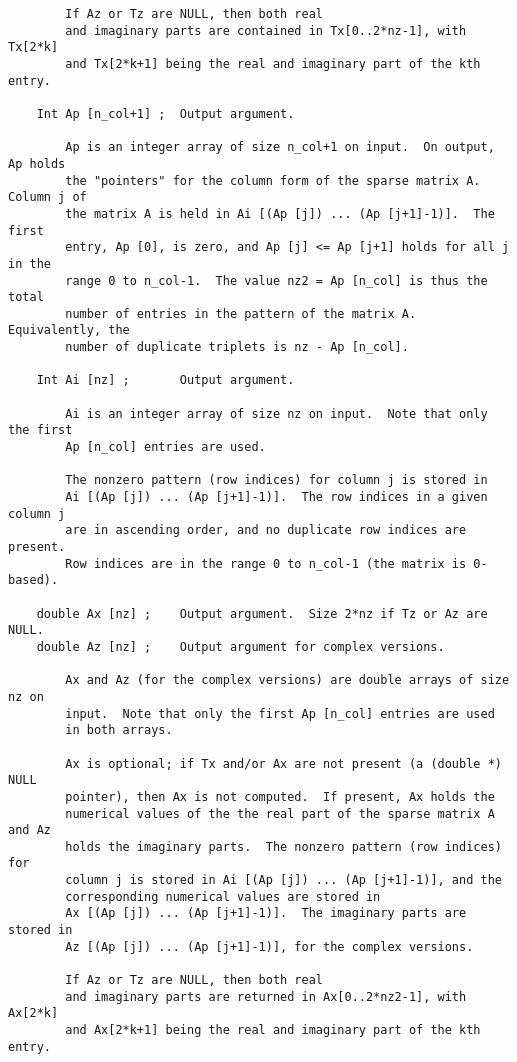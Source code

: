 \documentclass[11pt]{article}
\begin{document}
{\begin{verbatim}
        If Az or Tz are NULL, then both real
        and imaginary parts are contained in Tx[0..2*nz-1], with Tx[2*k]
        and Tx[2*k+1] being the real and imaginary part of the kth entry.

    Int Ap [n_col+1] ;  Output argument.

        Ap is an integer array of size n_col+1 on input.  On output, Ap holds
        the "pointers" for the column form of the sparse matrix A.  Column j of
        the matrix A is held in Ai [(Ap [j]) ... (Ap [j+1]-1)].  The first
        entry, Ap [0], is zero, and Ap [j] <= Ap [j+1] holds for all j in the
        range 0 to n_col-1.  The value nz2 = Ap [n_col] is thus the total
        number of entries in the pattern of the matrix A.  Equivalently, the
        number of duplicate triplets is nz - Ap [n_col].

    Int Ai [nz] ;       Output argument.

        Ai is an integer array of size nz on input.  Note that only the first
        Ap [n_col] entries are used.

        The nonzero pattern (row indices) for column j is stored in
        Ai [(Ap [j]) ... (Ap [j+1]-1)].  The row indices in a given column j
        are in ascending order, and no duplicate row indices are present.
        Row indices are in the range 0 to n_col-1 (the matrix is 0-based).

    double Ax [nz] ;    Output argument.  Size 2*nz if Tz or Az are NULL.
    double Az [nz] ;    Output argument for complex versions.

        Ax and Az (for the complex versions) are double arrays of size nz on
        input.  Note that only the first Ap [n_col] entries are used
        in both arrays.

        Ax is optional; if Tx and/or Ax are not present (a (double *) NULL
        pointer), then Ax is not computed.  If present, Ax holds the
        numerical values of the the real part of the sparse matrix A and Az
        holds the imaginary parts.  The nonzero pattern (row indices) for
        column j is stored in Ai [(Ap [j]) ... (Ap [j+1]-1)], and the
        corresponding numerical values are stored in
        Ax [(Ap [j]) ... (Ap [j+1]-1)].  The imaginary parts are stored in
        Az [(Ap [j]) ... (Ap [j+1]-1)], for the complex versions.

        If Az or Tz are NULL, then both real
        and imaginary parts are returned in Ax[0..2*nz2-1], with Ax[2*k]
        and Ax[2*k+1] being the real and imaginary part of the kth entry.


\end{verbatim}}
\end{document}
